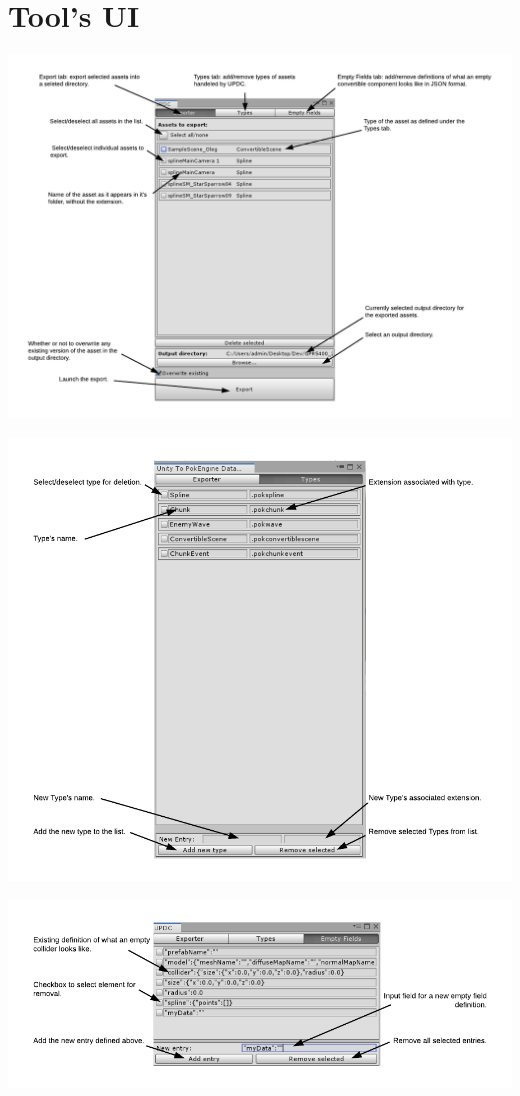 \documentclass[12pt,a4paper]{article}
\begin{document}
\section{Tool's UI}
\begin{center}
\includegraphics[scale=0.5]{exportUi}
\end{center}
\begin{center}
\includegraphics[scale=0.6]{typesUi}
\end{center}
\begin{center}
\includegraphics[scale=0.6]{emptyfieldsui}
\end{center}
\newpage
\end{document}
